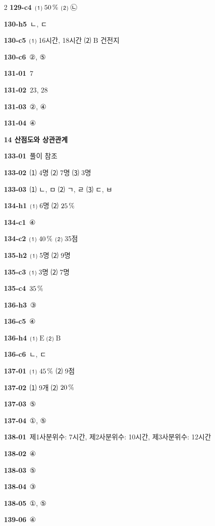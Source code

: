 \documentclass[10pt,a4paper]{article}
\newcommand{\pt}[1]{\mathrm{#1}}
\begin{document}
\begin{multicols}{2}
\noindent\textbf{129-c4}\ ⑴ $50\mkern3mu \%$ ⑵ ㉡\par
\noindent\textbf{130-h5}\ ㄴ, ㄷ\par
\noindent\textbf{130-c5}\ ⑴ 16시간, 18시간 ⑵ $\pt{B}$ 건전지\par
\noindent\textbf{130-c6}\ ②, ⑤\par
\noindent\textbf{131-01}\ $7$\par
\noindent\textbf{131-02}\ $23$, $28$\par
\noindent\textbf{131-03}\ ②, ④\par
\noindent\textbf{131-04}\ ④\par
\noindent\textbf{14 산점도와 상관관계}\par\smallskip
\noindent\textbf{133-01}\ 풀이 참조\par
\noindent\textbf{133-02}\ ⑴ 4명 ⑵ 7명 ⑶ 3명\par
\noindent\textbf{133-03}\ ⑴ ㄴ, ㅁ ⑵ ㄱ, ㄹ ⑶ ㄷ, ㅂ\par
\noindent\textbf{134-h1}\ ⑴ 6명 ⑵ $25\mkern3mu \%$\par
\noindent\textbf{134-c1}\ ④\par
\noindent\textbf{134-c2}\ ⑴ $40\mkern3mu \%$ ⑵ 35점\par
\noindent\textbf{135-h2}\ ⑴ 5명 ⑵ 9명\par
\noindent\textbf{135-c3}\ ⑴ 3명 ⑵ 7명\par
\noindent\textbf{135-c4}\ $35\mkern3mu \%$\par
\noindent\textbf{136-h3}\ ③\par
\noindent\textbf{136-c5}\ ④\par
\noindent\textbf{136-h4}\ ⑴ $\pt{E}$ ⑵ $\pt{B}$\par
\noindent\textbf{136-c6}\ ㄴ, ㄷ\par
\noindent\textbf{137-01}\ ⑴ $45\mkern3mu \%$ ⑵ 9점\par
\noindent\textbf{137-02}\ ⑴ 9개 ⑵ $20\mkern3mu \%$\par
\noindent\textbf{137-03}\ ⑤\par
\noindent\textbf{137-04}\ ①, ⑤\par
\noindent\textbf{138-01}\ 제1사분위수: 7시간, 제2사분위수: 10시간, 제3사분위수: 12시간\par
\noindent\textbf{138-02}\ ④\par
\noindent\textbf{138-03}\ ⑤\par
\noindent\textbf{138-04}\ ③\par
\noindent\textbf{138-05}\ ①, ⑤\par
\noindent\textbf{139-06}\ ④\par

\end{multicols}
\end{document}
